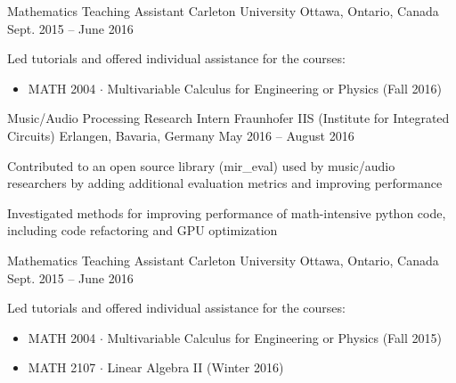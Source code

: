 

\begin{cventries}

  \cventry
    {Mathematics Teaching Assistant} %
    {Carleton University} %
    {Ottawa, Ontario, Canada} %
    {Sept. 2015 – June 2016} %
    {
      \begin{cvitems} %
        \item {Led tutorials and offered individual assistance for the courses:}
          \begin{itemize}
            \item {MATH 2004 $\cdot$ Multivariable Calculus for Engineering or Physics (Fall 2016)}
          \end{itemize}
      \end{cvitems}
    }

  \cventry
    {Music/Audio Processing Research Intern} %
    {Fraunhofer IIS (Institute for Integrated Circuits)} %
    {Erlangen, Bavaria, Germany} %
    {May 2016 – August 2016} %
    {
      \begin{cvitems} %
        \item {Contributed to an open source library (mir\_eval) used by music/audio researchers by adding additional evaluation metrics and improving performance}
        \item {Investigated methods for improving performance of math-intensive python code, including code refactoring and GPU optimization}
      \end{cvitems}
    }

  \cventry
    {Mathematics Teaching Assistant} %
    {Carleton University} %
    {Ottawa, Ontario, Canada} %
    {Sept. 2015 – June 2016} %
    {
      \begin{cvitems} %
        \item {Led tutorials and offered individual assistance for the courses:}
          \begin{itemize}
            \item {MATH 2004 $\cdot$ Multivariable Calculus for Engineering or Physics (Fall 2015)}
            \item {MATH 2107 $\cdot$ Linear Algebra II (Winter 2016)}
          \end{itemize}
      \end{cvitems}
    }


\end{cventries}
